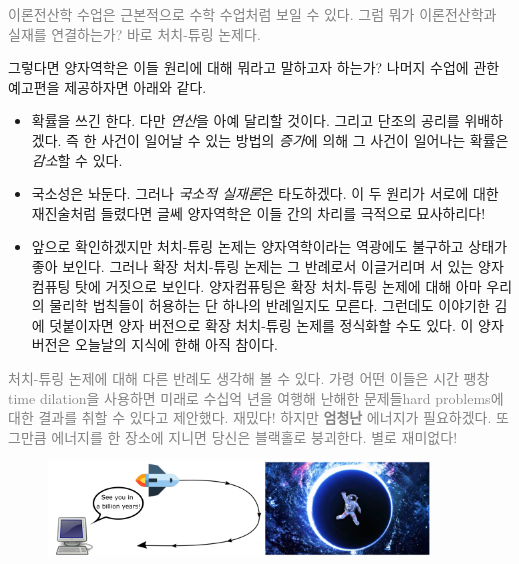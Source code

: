 \documentclass[a4paper,chapter,atbegshi,hidelinks]{oblivoir}
\begin{document}
\hfill

\hfill\parbox[t]{9cm}{\textcolor{gray}{이론전산학 수업은 근본적으로 수학 수업처럼
보일 수 있다. 그럼 뭐가 이론전산학과 실재를 연결하는가? 바로 처치-튜링 논제다.}}

\hfill\break

그렇다면 양자역학은 이들 원리에 대해 뭐라고 말하고자 하는가? 나머지 수업에 관한
예고편을 제공하자면 아래와 같다.

\hfill

\begin{itemize}[label=$\blacktriangleright$]
    \item 확률을 쓰긴 한다. 다만 \emph{연산}을 아예
        달리할 것이다. 그리고 단조의 공리를 위배하겠다. 즉 한 사건이
        일어날 수 있는 방법의 \emph{증가}에 의해 그 사건이 일어나는 확률은
        \emph{감소}할 수 있다.
    \item 국소성은 놔둔다. 그러나 \emph{국소적 실재론}은 타도하겠다. 이 두
        원리가 서로에 대한 재진술처럼 들렸다면 글쎄 양자역학은 이들 간의 차리를
        극적으로 묘사하리다!
    \item 앞으로 확인하겠지만 처치-튜링 논제는 양자역학이라는 역광에도 불구하고
        상태가 좋아 보인다. 그러나 확장 처치-튜링 논제는 그 반례로서 이글거리며
        서 있는 양자컴퓨팅 탓에 거짓으로 보인다. 양자컴퓨팅은 확장 처치-튜링 
        논제에 대해 아마 우리의 물리학 법칙들이 허용하는 단 하나의 반례일지도
        모른다. 그런데도 이야기한 김에 덧붙이자면 양자 버전으로 확장 처치-튜링
        논제를 정식화할 수도 있다. 이 양자 버전은 오늘날의 지식에 한해 아직 
        참이다.
\end{itemize}

\hfill\break

\hfill\parbox[t]{9cm}{\textcolor{gray}{ 처치-튜링 논제에 대해 다른
반례도 생각해 볼 수 있다. 가령 어떤 이들은 시간 팽창{\footnotesize time 
dilation}을 사용하면 미래로 수십억 년을 여행해 난해한 문제들{\footnotesize hard
problems}에 대한 결과를 취할 수 있다고 제안했다. 재밌다! 하지만 \textbf{엄청난}
에너지가 필요하겠다. 또 그만큼 에너지를 한 장소에 지니면 당신은 블랙홀로
붕괴한다. 별로 재미없다!}}

\hfill\break

\begin{figure}[h]
    \centering
    \includegraphics[width=0.9\textwidth]{iqis1_003}
\end{figure}
\end{document}
